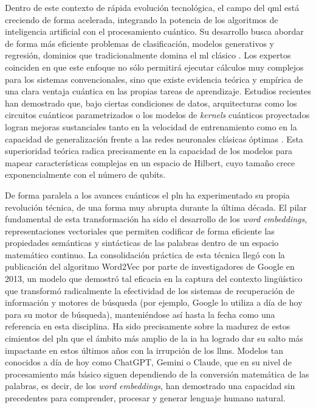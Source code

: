 Dentro de este contexto de rápida evolución tecnológica, el campo del \gls{qml} está creciendo de forma acelerada, integrando la potencia de los algoritmos de inteligencia artificial con el procesamiento cuántico. Su desarrollo busca abordar de forma más eficiente problemas de clasificación, modelos generativos y regresión, dominios que tradicionalmente domina el \gls{ml} clásico \cite{biamonte_quantum_ml_2017, benedetti_pqc_ml_2019, ohno_qword2vec_2025}. Los expertos coinciden en que este enfoque no sólo permitirá ejecutar cálculos muy complejos para los sistemas convencionales, sino que existe evidencia teórica y empírica de una clara ventaja cuántica en las propias tareas de aprendizaje. Estudios recientes han demostrado que, bajo ciertas condiciones de datos, arquitecturas como los circuitos cuánticos parametrizados o los modelos de \textit{kernels} cuánticos proyectados logran mejoras sustanciales tanto en la velocidad de entrenamiento como en la capacidad de generalización frente a las redes neuronales clásicas óptimas \cite{abbas_power_2021, huang_power_2021, caro_generalization_2022}. Esta superioridad teórica radica precisamente en la capacidad de los modelos para mapear características complejas en un espacio de Hilbert, cuyo tamaño crece exponencialmente con el número de qubits.

De forma paralela a los avances cuánticos el \gls{pln} ha experimentado su propia revolución técnica, de una forma muy abrupta durante la última década. El pilar fundamental de esta transformación ha sido el desarrollo de los \textit{word embeddings}, representaciones vectoriales que permiten codificar de forma eficiente las propiedades semánticas y sintácticas de las palabras dentro de un espacio matemático continuo. La consolidación práctica de esta técnica llegó con la publicación del algoritmo Word2Vec \cite{mikolov_skipgram_phrases_2013} por parte de investigadores de Google en 2013, un modelo que demostró tal eficacia en la captura del contexto lingüístico que transformó radicalmente la efectividad de los sistemas de recuperación de información y motores de búsqueda (por ejemplo, Google lo utiliza a día de hoy para su motor de búsqueda), manteniéndose así hasta la fecha como una referencia en esta disciplina. Ha sido precisamente sobre la madurez de estos cimientos del \gls{pln} que el ámbito más amplio de la \gls{ia} ha logrado dar su salto más impactante en estos últimos años con la irrupción de los \glspl{llm}. Modelos tan conocidos a día de hoy como ChatGPT, Gemini o Claude, que en su nivel de procesamiento más básico siguen dependiendo de la conversión matemática de las palabras, es decir, de los \textit{word embeddings}, han demostrado una capacidad sin precedentes para comprender, procesar y generar lenguaje humano natural.

